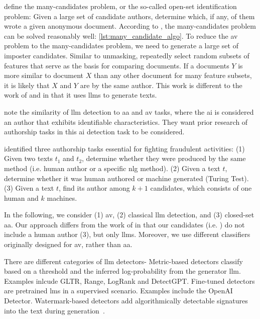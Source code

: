 \citet{koppel_determining_2014} define the many-candidates problem, or the so-called open-set identification problem:
Given a large set of candidate authors, determine which, if any, of them wrote a given anonymous document.
According to \citet{koppel_determining_2014}, the many-candidates problem can be solved reasonably well: \autoref{lst:many_candidate_algo}.
To reduce the \ac{av} problem to the many-candidates problem, we need to generate a large set of imposter candidates.
Similar to unmasking, \citet{koppel_determining_2014} repeatedly select random subsets of features that serve as the basis for comparing documents.
If a documents $Y$ is more similar to document $X$ than any other document for many feature subsets, 
it is likely that $X$ and $Y$ are by the same author.
This work is different to the work of \citet{koppel_determining_2014} and \citet{kocher_unine_2015} 
in that it uses \acp{llm} to generate \imp{} texts.

\citet{bevendorff_overview_2024} note the similarity of \ac{llm} detection to \ac{aa} and \ac{av} tasks, 
where the \ac{ai} is considered an author that exhibits identifiable characteristics.
They want prior research of authorship tasks in this \ac{ai} detection task to be considered.


\citet{uchendu_authorship_2020} identified three authorship tasks essential for fighting fraudulent activities:
(1) Given two texts $t_1$ and $t_2$, determine whether they were produced by the same method (i.e. human author or a specific \ac{nlg} method).
(2) Given a text $t$, determine whether it was human authored or machine generated (Turing Test).
(3) Given a text $t$, find its author among $k+1$ candidates, which consists of one human and $k$ machines.

In the following, we consider (1) \ac{av}, (2) classical \ac{llm} detection, and (3) closed-set \ac{aa}.
Our approach differs from the work of \citet{uchendu_authorship_2020} in that our candidates (i.e. \imps{}) do not include a human author (3), 
but only \acp{llm}.
Moreover, we use different classifiers originally designed for \ac{av}, rather than \ac{aa}.

There are different categories of \ac{llm} detectors-
Metric-based detectors classify based on a threshold and the inferred log-probability from the generator \ac{llm}.
Examples inlcude GLTR, Range, LogRank and DetectGPT.
Fine-tuned detectors are pretrained \acp{lm} in a supervised scenario.
Examples include the OpenAI Detector.
Watermark-based detectors add algorithmically detectable signatures into the text during generation~\citep{wang_stumbling_2024}.


